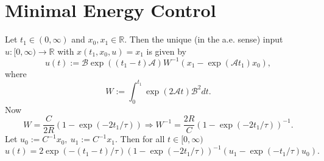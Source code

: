 \documentclass[10pt, a4paper]{article} %
\begin{document}
\section{Minimal Energy Control}
Let $t_1 \in (0, \infty)$ and $x_0 ,x_1 \in \mathbb{R}$.
Then the unique (in the a.e. sense) input $u: [0, \infty) \to \mathbb{R}$ with 
$x(t_1,x_0,u) = x_1$ is given by
\begin{equation*}
	u(t) := \mathcal{B} \exp ( (t_1-t) \mathcal{A}) W^{-1} (x_1 - \exp ( \mathcal{A} t_1) x_0),
\end{equation*}
where
\begin{equation*}
	W := \int_0^{t_1} \exp ( 2 \mathcal{A} t) \mathcal{B}^2 dt.
\end{equation*}
Now
\begin{equation*}
	W= \frac{C}{ 2R} (1-\exp (-2 t_1/\tau )) \Rightarrow W^{-1} =  \frac{2R}{C} (1 -\exp (-2t_1/\tau ))^{-1}.
\end{equation*}
Let $u_0 := C^{-1} x_0, \ u_1 := C^{-1}x_1$. Then for all $t \in [0, \infty)$
\begin{equation*}
	u(t) = 2 \exp (-(t_1 -t)/\tau)  (1 - \exp (-2t_1/\tau))^{-1} (u_1 - \exp (-t_1/\tau) u_0).
\end{equation*}
\end{document}
